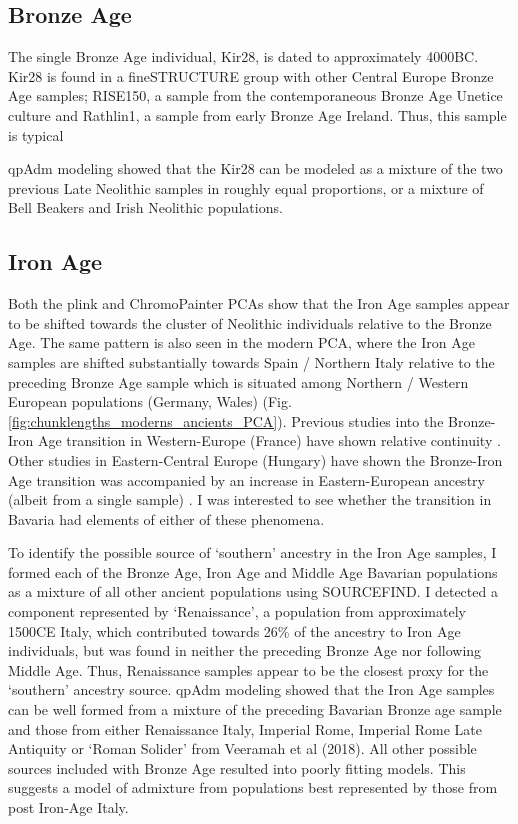 \subsection{Bronze Age}

The single  Bronze Age individual, Kir28, is dated to approximately 4000BC. Kir28 is found in a fineSTRUCTURE group with other Central Europe Bronze Age samples; RISE150, a sample from the contemporaneous Bronze Age Unetice culture and Rathlin1, a sample from  early Bronze Age Ireland. Thus, this sample is typical

qpAdm modeling showed that the Kir28 can be modeled as a mixture of the two previous Late Neolithic samples in roughly equal proportions, or a mixture of Bell Beakers and Irish Neolithic populations. 

\subsection{Iron Age}

Both the plink and ChromoPainter PCAs show that the Iron Age samples appear to be shifted towards the cluster of Neolithic individuals relative to the Bronze Age. The same pattern is also seen in the modern PCA, where the Iron Age samples are shifted substantially towards Spain / Northern Italy relative to the preceding Bronze Age sample which is situated among Northern / Western European populations (Germany, Wales) (Fig. \ref{fig:chunklengths_moderns_ancients_PCA}). Previous studies into the Bronze-Iron Age transition in Western-Europe (France) have shown relative continuity \cite{Brunel12791}. Other studies in Eastern-Central Europe (Hungary) have shown the Bronze-Iron Age transition was accompanied by an increase in Eastern-European ancestry (albeit from a single sample) \cite{Gamba2014}. I was interested to see whether the transition in Bavaria had elements of either of these phenomena. 

To identify the possible source of `southern' ancestry in the Iron Age samples, I formed each of the Bronze Age, Iron Age and Middle Age Bavarian populations as a mixture of all other ancient populations using SOURCEFIND. I detected a component represented by `Renaissance', a population from approximately 1500CE Italy, which contributed towards 26\% of the ancestry to Iron Age individuals, but was found in neither the preceding Bronze Age nor following Middle Age. Thus, Renaissance samples appear to be the closest proxy for the `southern' ancestry source. qpAdm modeling showed that the Iron Age samples can be well formed from a mixture of the preceding Bavarian Bronze age sample and those from either Renaissance Italy, Imperial Rome, Imperial Rome Late Antiquity or `Roman Solider' from Veeramah et al (2018). All other possible sources included with Bronze Age resulted into poorly fitting models. This suggests a model of admixture from populations best represented by those from post Iron-Age Italy. 

